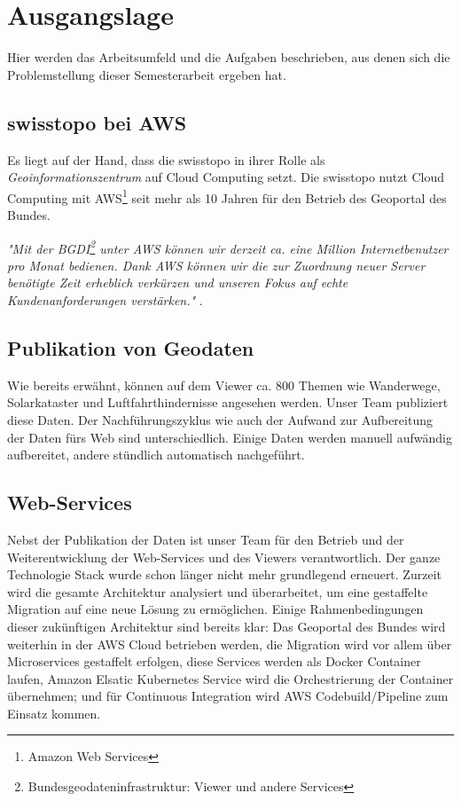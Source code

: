 \section{Ausgangslage}
Hier werden das Arbeitsumfeld und die Aufgaben beschrieben, aus denen sich die Problemstellung dieser Semesterarbeit ergeben hat.

\subsection{swisstopo bei AWS}
Es liegt auf der Hand, dass die swisstopo in ihrer Rolle als \emph{Geoinformationszentrum} auf Cloud Computing setzt. Die swisstopo nutzt Cloud Computing mit AWS\footnote{Amazon Web Services} seit mehr als 10 Jahren für den Betrieb des Geoportal des Bundes.
 
\textit{"Mit der BGDI\footnote{Bundesgeodateninfrastruktur: Viewer und andere Services} unter AWS können wir derzeit ca. eine Million Internetbenutzer pro Monat bedienen. Dank AWS können wir die zur Zuordnung neuer Server benötigte Zeit erheblich verkürzen und unseren Fokus auf echte Kundenanforderungen verstärken."} \cite{Christ2020}.


\subsection{Publikation von Geodaten}
Wie bereits erwähnt, können auf dem Viewer ca. 800 Themen wie Wanderwege, Solarkataster und Luftfahrthindernisse angesehen werden. Unser Team publiziert diese Daten. Der Nachführungszyklus wie auch der Aufwand zur
Aufbereitung der Daten fürs Web sind unterschiedlich. Einige Daten werden manuell aufwändig aufbereitet, andere
stündlich automatisch nachgeführt.

\subsection{Web-Services}
Nebst der Publikation der Daten ist unser Team für den Betrieb und der Weiterentwicklung der Web-Services
und des Viewers verantwortlich. Der ganze Technologie Stack wurde schon länger nicht mehr grundlegend erneuert. Zurzeit wird
die gesamte Architektur analysiert und überarbeitet, um eine gestaffelte Migration auf eine neue
Lösung zu ermöglichen.
Einige Rahmenbedingungen dieser zukünftigen Architektur sind bereits klar: Das Geoportal des
Bundes wird weiterhin in der AWS Cloud betrieben werden, die Migration wird vor allem über
Microservices gestaffelt erfolgen, diese Services werden als Docker Container laufen, Amazon
Elsatic Kubernetes Service wird die Orchestrierung der Container übernehmen; und für Continuous
Integration wird AWS Codebuild/Pipeline zum Einsatz kommen.

